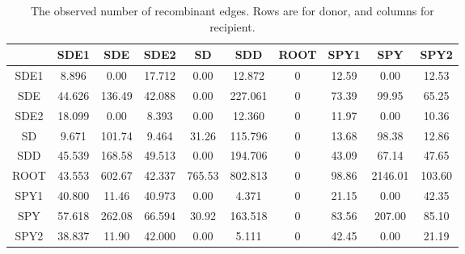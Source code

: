 \documentclass[english]{article}
\providecommand{\tabularnewline}{\\}
\begin{document}
\begin{table}
\caption{\label{tab:obsheatmap}The observed number of recombinant edges.
Rows are for donor, and columns for recipient.}
\noindent \centering{}\begin{tabular}{cccccccccc}
\hline
& SDE1 & SDE & SDE2 & SD & SDD & ROOT & SPY1 & SPY & SPY2 \tabularnewline
\hline
SDE1&8.896 &  0.00 &17.712  & 0.00 & 12.872   & 0 &12.59  &  0.00  &12.53\tabularnewline
SDE &44.626& 136.49& 42.088 &  0.00& 227.061  &  0& 73.39 &  99.95 & 65.25\tabularnewline
SDE2&18.099&   0.00&  8.393 &  0.00&  12.360  &  0& 11.97 &   0.00 & 10.36\tabularnewline
SD  &9.671 &101.74 & 9.464  &31.26 &115.796   & 0 &13.68  & 98.38  &12.86\tabularnewline
SDD &45.539& 168.58& 49.513 &  0.00& 194.706  &  0& 43.09 &  67.14 & 47.65\tabularnewline
ROOT&43.553& 602.67& 42.337 &765.53& 802.813  &  0& 98.86 &2146.01 &103.60\tabularnewline
SPY1&40.800&  11.46& 40.973 &  0.00&   4.371  &  0& 21.15 &   0.00 & 42.35\tabularnewline
SPY &57.618& 262.08& 66.594 & 30.92& 163.518  &  0& 83.56 & 207.00 & 85.10\tabularnewline
SPY2&38.837&  11.90& 42.000 &  0.00&   5.111  &  0& 42.45 &   0.00 & 21.19\tabularnewline
\hline
\end{tabular}
\end{table}
\clearpage{}
\end{document}
